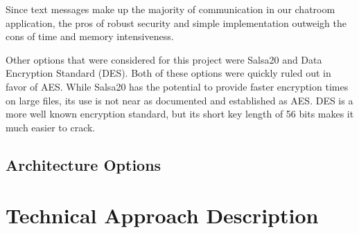 \documentclass{article}
\begin{document}
Since text messages make up the majority of communication in our chatroom application, the pros of robust security and simple implementation outweigh the cons of time and memory intensiveness. 

Other options that were considered for this project were Salsa20 and Data Encryption Standard (DES). Both of these options were quickly ruled out in favor of AES. While Salsa20 has the potential to provide faster encryption times on large files, its use is not near as documented and established as AES. DES is a more well known encryption standard, but its short key length of 56 bits makes it much easier to crack. 

\subsection{Architecture Options}

\section{Technical Approach Description}








\end{document}
